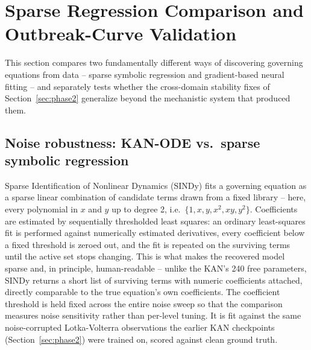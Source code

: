 \section{Sparse Regression Comparison and Outbreak-Curve Validation}
\label{sec:track-e}

This section compares two fundamentally different ways of discovering
governing equations from data -- sparse symbolic regression and gradient-based
neural fitting -- and separately tests whether the cross-domain stability
fixes of Section~\ref{sec:phase2} generalize beyond the mechanistic system
that produced them.

\subsection{Noise robustness: KAN-ODE vs.\ sparse symbolic regression}

Sparse Identification of Nonlinear Dynamics (SINDy) \cite{brunton2016sindy}
fits a governing equation as a sparse linear combination of candidate terms
drawn from a fixed library -- here, every polynomial in $x$ and $y$ up to
degree 2, i.e.\ $\{1,x,y,x^2,xy,y^2\}$. Coefficients are estimated by
sequentially thresholded least squares: an ordinary least-squares fit is
performed against numerically estimated derivatives, every coefficient
below a fixed threshold is zeroed out, and the fit is repeated on the
surviving terms until the active set stops changing. This is what makes the
recovered model sparse and, in principle, human-readable -- unlike the KAN's
240 free parameters, SINDy returns a short list of surviving terms with
numeric coefficients attached, directly comparable to the true equation's
own coefficients. The coefficient threshold is held fixed across the entire
noise sweep so that the comparison measures noise sensitivity rather than
per-level tuning. It is fit against the same noise-corrupted Lotka-Volterra
observations the earlier KAN checkpoints (Section~\ref{sec:phase2}) were
trained on, scored against clean ground truth.

\begin{expectbox}
\end{expectbox}

